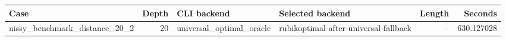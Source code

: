 {\small
\begin{tabular}{lrllrr}
\hline
Case & Depth & CLI backend & Selected backend & Length & Seconds \\
\hline
nissy\_benchmark\_distance\_20\_2 & 20 & universal\_optimal\_oracle & rubikoptimal-after-universal-fallback & -- & 630.127028 \\
\hline
\end{tabular}
}
